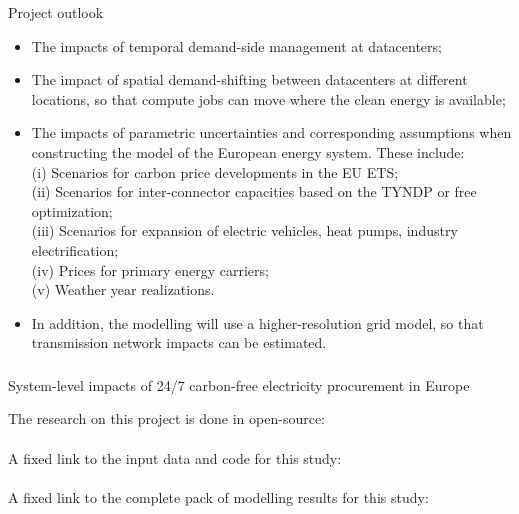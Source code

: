 {\begin{frame}{Project outlook}
    \begin{itemize}
      \item The impacts of \alert{temporal demand-side management} at datacenters;
      \item The impact of \alert{spatial demand-shifting between datacenters} at different locations, 
      so that compute jobs can move where the clean energy is available;
      \item The impacts of \alert{parametric uncertainties} and corresponding assumptions when constructing the model of 
      the European energy system. These include: \\
      \quad (i) Scenarios for carbon price developments in the EU ETS; \\
      \quad (ii) Scenarios for inter-connector capacities based on the TYNDP or free optimization; \\
      \quad (iii) Scenarios for expansion of electric vehicles, heat pumps, industry electrification; \\
      \quad (iv) Prices for primary energy carriers; \\ 
      \quad (v) Weather year realizations. 
      \item In addition, the modelling will use a \alert{higher-resolution grid} model,
       so that transmission network impacts can be estimated.
    \end{itemize}

\end{frame}



\begin{frame}\frametitle{\quad}

  {\Large
  \alert{System-level impacts of 24/7 carbon-free electricity procurement in Europe}
  }

  \vspace{.3cm}
  The research on this project is done in open-source: \\
   \\
  A fixed link to the input data and code for this study: \\
   \\
  A fixed link to the complete pack of modelling results for this study: \\
   \\


\end{frame}}
